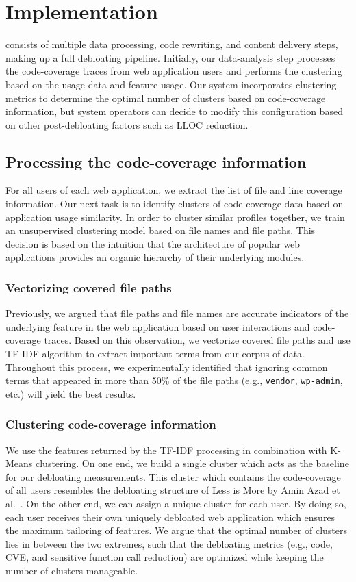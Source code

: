 \section{Implementation}

\dbltr{} consists of multiple data processing, code rewriting, and content delivery steps, making up a full debloating pipeline. 
Initially, our data-analysis step processes the code-coverage traces from web application users and performs the clustering based on the usage data and feature usage. 
Our system incorporates clustering metrics to determine the optimal number of clusters based on code-coverage information, but system operators can decide to modify this configuration based on other post-debloating factors such as LLOC reduction. 

\subsection{Processing the code-coverage information}

For all users of each web application, we extract the list of file and line coverage information. 
Our next task is to identify clusters of code-coverage data based on application usage similarity. 
In order to cluster similar profiles together, we train an unsupervised clustering model based on file names and file paths. 
This decision is based on the intuition that the architecture of popular web applications provides an organic hierarchy of their underlying modules. 

\subsubsection{Vectorizing covered file paths} 
Previously, we argued that file paths and file names are accurate indicators of the underlying feature in the web application based on user interactions and code-coverage traces. 
Based on this observation, we vectorize covered file paths and use TF-IDF algorithm to extract important terms from our corpus of data. 
Throughout this process, we experimentally identified that ignoring common terms that appeared in more than 50\% of the file paths (e.g., \texttt{vendor}, \texttt{wp-admin}, etc.) will yield the best results. 


\subsubsection{Clustering code-coverage information} We use the features returned by the TF-IDF processing in combination with K-Means clustering. 
On one end, we build a single cluster which acts as the baseline for our debloating measurements. 
This cluster which contains the code-coverage of all users resembles the debloating structure of Less is More by Amin Azad et al.~\cite{lessismore}. 
On the other end, we can assign a unique cluster for each user. 
By doing so, each user receives their own uniquely debloated web application which ensures the maximum tailoring of features. 
We argue that the optimal number of clusters lies in between the two extremes, such that the debloating metrics (e.g., code, CVE, and sensitive function call reduction) are optimized while keeping the number of clusters manageable. 

